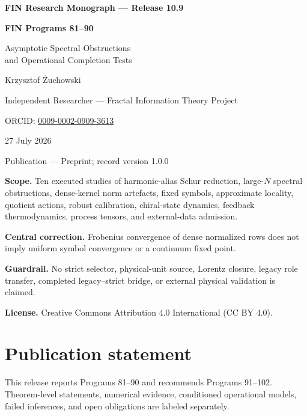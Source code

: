\documentclass[11pt,a4paper,openany]{report}
\begin{document}
\hypersetup{pageanchor=false}
\begin{titlepage}
\centering
\vspace*{9mm}
{\Large\bfseries FIN Research Monograph --- Release 10.9\par}
\vspace{11mm}
{\Huge\bfseries FIN Programs 81--90\par}
\vspace{6mm}
{\Large Asymptotic Spectral Obstructions\\
and Operational Completion Tests\par}
\vspace{17mm}
{\Large Krzysztof \.Zuchowski\par}
\vspace{2mm}
{\normalsize Independent Researcher --- Fractal Information Theory Project\par}
\vspace{2mm}
{\normalsize ORCID: \href{https://orcid.org/0009-0002-0909-3613}{0009-0002-0909-3613}\par}
\vspace{10mm}
{\large 27 July 2026\par}
{\normalsize Publication --- Preprint; record version 1.0.0\par}
\vfill
\begin{minipage}{0.88\textwidth}
\small
\textbf{Scope.} Ten executed studies of harmonic-alias Schur reduction,
large-\(N\) spectral obstructions, dense-kernel norm artefacts, fixed symbols,
approximate locality, quotient actions, robust calibration, chiral-state
dynamics, feedback thermodynamics, process tensors, and external-data
admission.

\medskip
\textbf{Central correction.} Frobenius convergence of dense normalized rows
does not imply uniform symbol convergence or a continuum fixed point.

\medskip
\textbf{Guardrail.} No strict selector, physical-unit source, Lorentz closure,
legacy role transfer, completed legacy--strict bridge, or external physical
validation is claimed.

\medskip
\textbf{License.} Creative Commons Attribution 4.0 International (CC BY 4.0).
\end{minipage}
\vfill
\end{titlepage}
\hypersetup{pageanchor=true}

\chapter*{Publication statement}
This release reports Programs 81--90 and recommends Programs 91--102.
Theorem-level statements, numerical evidence, conditioned operational models,
failed inferences, and open obligations are labeled separately.
\end{document}
